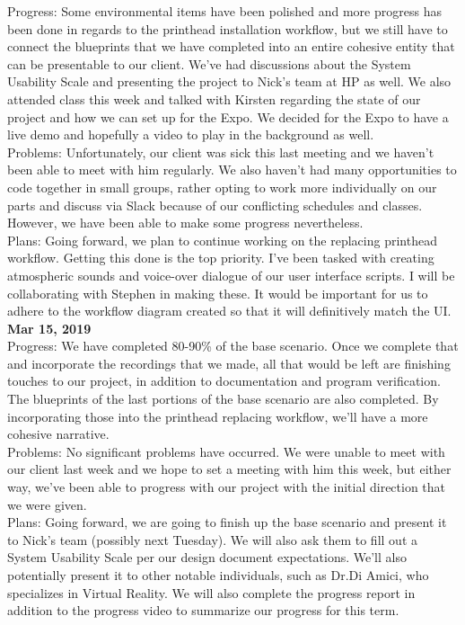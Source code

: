Progress: 	Some environmental items have been polished and more progress has been done in regards to the printhead installation workflow, but we still have to connect the blueprints that we have completed into an entire cohesive entity that can be presentable to our client. We've had discussions about the System Usability Scale and presenting the project to Nick's team at HP as well. We also attended class this week and talked with Kirsten regarding the state of our project and how we can set up for the Expo. We decided for the Expo to have a live demo and hopefully a video to play in the background as well.\\
Problems: 	Unfortunately, our client was sick this last meeting and we haven't been able to meet with him regularly. We also haven't had many opportunities to code together in small groups, rather opting to work more individually on our parts and discuss via Slack because of our conflicting schedules and classes. However, we have been able to make some progress nevertheless.\\
Plans: 	Going forward, we plan to continue working on the replacing printhead workflow. Getting this done is the top priority. I've been tasked with creating atmospheric sounds and voice-over dialogue of our user interface scripts. I will be collaborating with Stephen in making these. It would be important for us to adhere to the workflow diagram created so that it will definitively match the UI. 
\\
\textbf{Mar 15, 2019}\\
Progress: 	We have completed 80-90\% of the base scenario. Once we complete that and incorporate the recordings that we made, all that would be left are finishing touches to our project, in addition to documentation and program verification. The blueprints of the last portions of the base scenario are also completed. By incorporating those into the printhead replacing workflow, we'll have a more cohesive narrative.\\
Problems: 	No significant problems have occurred. We were unable to meet with our client last week and we hope to set a meeting with him this week, but either way, we've been able to progress with our project with the initial direction that we were given.\\
Plans: 	Going forward, we are going to finish up the base scenario and present it to Nick's team (possibly next Tuesday). We will also ask them to fill out a System Usability Scale per our design document expectations. We'll also potentially present it to other notable individuals, such as Dr.Di Amici, who specializes in Virtual Reality. We will also complete the progress report in addition to the progress video to summarize our progress for this term. 
\\


